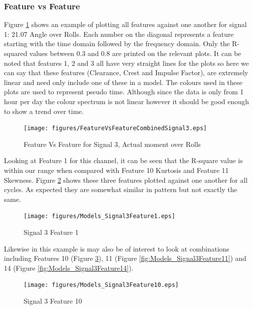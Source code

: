 \documentclass{article}
\begin{document}
\subsubsection{Feature vs Feature}
Figure \ref{fig:FeatureVsFeatureCombinedSignal3} shows an example of plotting all features against one another for signal 1: 21.07 Angle over Rolls. Each number on the diagonal represents a feature starting with the time domain followed by the frequency domain. Only the R-squared values between 0.3 and 0.8 are printed on the relevant plots. It can be noted that features 1, 2 and 3 all have very straight lines for the plots so here we can say that these features (Clearance, Crest and Impulse Factor), are extremely linear and need only include one of these in a model.
The colours used in these plots are used to represent pseudo time. Although since the data is only from 1 hour per day the colour spectrum is not linear however it should be good enough to show a trend over time.
\begin{figure}[H]
    \centering
    \texttt{[image: figures/FeatureVsFeatureCombinedSignal3.eps]}
    \caption{Feature Vs Feature for Signal 3, Actual moment over Rolls}
    \label{fig:FeatureVsFeatureCombinedSignal3}
\end{figure}

Looking at Feature 1 for this channel, it can be seen that the R-square value is within our range when compared with Feature 10 Kurtosis and Feature 11 Skewness. Figure \ref{fig:Models_Signal3Feature1} shows these three features plotted against one another for all cycles. As expected they are somewhat similar in pattern but not exactly the same.
\begin{figure}[H]
    \centering
    \texttt{[image: figures/Models\_Signal3Feature1.eps]}
    \caption{Signal 3 Feature 1}
    \label{fig:Models_Signal3Feature1}
\end{figure}
Likewise in this example is may also be of interest to look at combinations including Features 10 (Figure \ref{fig:Models_Signal3Feature10}), 11 (Figure \ref{fig:Models_Signal3Feature11}) and 14 (Figure \ref{fig:Models_Signal3Feature14}).
\begin{figure}[H]
    \centering
    \texttt{[image: figures/Models\_Signal3Feature10.eps]}
    \caption{Signal 3 Feature 10}
    \label{fig:Models_Signal3Feature10}
\end{figure}
 
\end{document}
